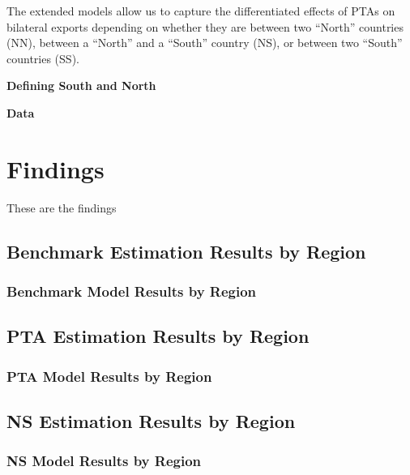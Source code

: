 \documentclass[12pt]{article}%
\begin{document}
The extended models allow us to capture the differentiated effects of
PTAs on bilateral exports depending on whether they are between two
``North'' countries (NN), between a ``North'' and a ``South'' country
(NS), or between two ``South'' countries (SS).

\textbf{Defining South and North}

\textbf{Data}

%
\section{Findings}%
\label{sec:Findings}%
These are the findings

%
\subsection{Benchmark Estimation Results by Region}%
\label{subsec:BenchmarkEstimationResultsbyRegion}%
\subsubsection{Benchmark Model Results by Region}%
\label{ssubsec:BenchmarkModelResultsbyRegion}%


%
\subsection{PTA Estimation Results by Region}%
\label{subsec:PTAEstimationResultsbyRegion}%
\subsubsection{PTA Model Results by Region}%
\label{ssubsec:PTAModelResultsbyRegion}%
%
%
%
%


%
\subsection{NS Estimation Results by Region}%
\label{subsec:NSEstimationResultsbyRegion}%
\subsubsection{NS Model Results by Region}%
\label{ssubsec:NSModelResultsbyRegion}%

\end{document}

